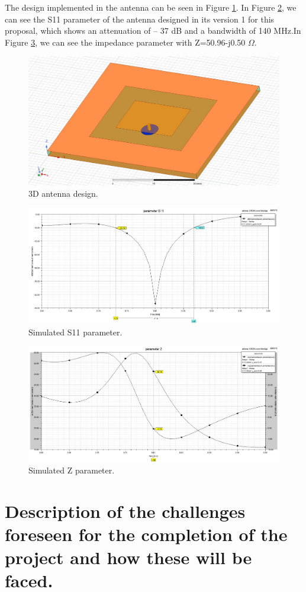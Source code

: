 \documentclass[lettersize,journal]{IEEEtran}
\begin{document}
The design implemented in the antenna can be seen in Figure \ref{fig:Antenna}. In Figure \ref{fig:S11}, we can see the S11 parameter of the antenna designed in its version 1 for this proposal, which shows an attenuation of – 37 dB and a bandwidth of 140 MHz.In Figure \ref{fig:Parameter Z}, we can see the impedance parameter with Z=50.96-j0.50 $\Omega$.


\begin{figure}[H]
\centering
\includegraphics[width=0.5\linewidth]{figs/Antenna.jpeg}
\caption{3D antenna design.}
\label{fig:Antenna}
\end{figure}

\begin{figure}[H]
\centering
\includegraphics[width=0.7\linewidth]{figs/S11.jpeg}
\caption{Simulated S11 parameter.}
\label{fig:S11}
\end{figure}

\begin{figure}[H]
\centering
\includegraphics[width=0.7\linewidth]{figs/Parameter Z.jpeg}
\caption{Simulated Z parameter.}
\label{fig:Parameter Z}
\end{figure}



\section{Description of the challenges foreseen for the completion of the project and how these will be faced.}
\end{document}
